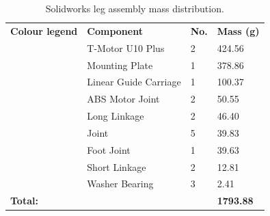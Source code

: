 \begin{table}[]
\centering
\begin{tabular}{llll}
\textbf{Colour legend}                          & \textbf{Component}    & \textbf{No.} & \textbf{Mass (g)} \\
\cellcolor[HTML]{FE0000}                        & T-Motor U10 Plus      & 2            & 424.56            \\
\cellcolor[HTML]{CB0000}                        & Mounting Plate        & 1            & 378.86            \\
\cellcolor[HTML]{010066}{\color[HTML]{000000} } & Linear Guide Carriage & 1            & 100.37            \\
\cellcolor[HTML]{3531FF}                        & ABS Motor Joint       & 2            & 50.55             \\
\cellcolor[HTML]{3531FF}                        & Long Linkage          & 2            & 46.40             \\
\cellcolor[HTML]{3531FF}                        & Joint                 & 5            & 39.83             \\
\cellcolor[HTML]{3531FF}                        & Foot Joint            & 1            & 39.63             \\
\cellcolor[HTML]{3531FF}                        & Short Linkage         & 2            & 12.81             \\
\cellcolor[HTML]{3531FF}                        & Washer Bearing        & 3            & 2.41              \\
\textbf{Total:}                                 & \textbf{}             & \textbf{}    & \textbf{1793.88} 
\end{tabular}
\caption{Solidworks leg assembly mass distribution.}
\label{tbl:Solidworks leg assembly mass distribution}
\end{table}

